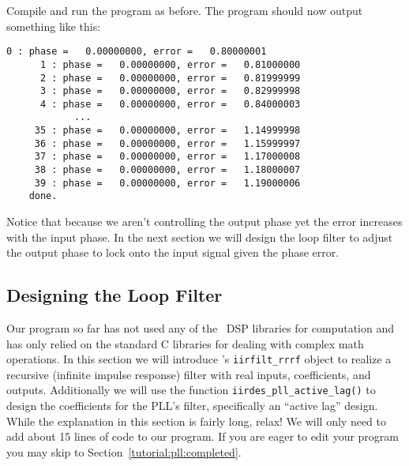 %
Compile and run the program as before.
The program should now output something like this:
%
\begin{Verbatim}[fontsize=\small]
      0 : phase =   0.00000000, error =   0.80000001
      1 : phase =   0.00000000, error =   0.81000000
      2 : phase =   0.00000000, error =   0.81999999
      3 : phase =   0.00000000, error =   0.82999998
      4 : phase =   0.00000000, error =   0.84000003
            ...
     35 : phase =   0.00000000, error =   1.14999998
     36 : phase =   0.00000000, error =   1.15999997
     37 : phase =   0.00000000, error =   1.17000008
     38 : phase =   0.00000000, error =   1.18000007
     39 : phase =   0.00000000, error =   1.19000006
    done.
\end{Verbatim}
%
Notice that because we aren't controlling the output phase yet
the error increases with the input phase.
In the next section we will design the loop filter to adjust the output
phase to lock onto the input signal given the phase error.

\subsection{Designing the Loop Filter}
\label{tutorial:pll:design}

Our program so far has not used any of the \liquid\ DSP libraries for
computation and has only relied on the standard C libraries for dealing
with complex math operations.
In this section we will introduce \liquid's {\tt iirfilt\_rrrf} object
to realize a recursive (infinite impulse response) filter with real
inputs, coefficients, and outputs.
Additionally we will use the function {\tt iirdes\_pll\_active\_lag()}
to design the coefficients for the PLL's filter,
specifically an ``active lag'' design.
While the explanation in this section is fairly long, relax!
We will only need to add about 15 lines of code to our program.
If you are eager to edit your program you may skip to
Section~\ref{tutorial:pll:completed}.

